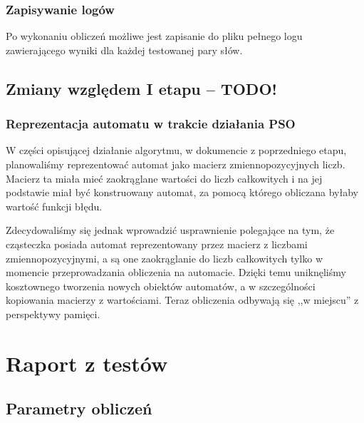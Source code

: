\documentclass{../llncs_template_final/llncs}
\begin{document}
\subsubsection{Zapisywanie logów}
Po wykonaniu obliczeń możliwe jest zapisanie do pliku pełnego logu zawierającego wyniki dla każdej testowanej pary słów.

\subsection{Zmiany względem I etapu -- TODO!}

\subsubsection{Reprezentacja automatu w trakcie działania PSO}

W części opisującej działanie algorytmu, w dokumencie z poprzedniego etapu, planowaliśmy reprezentować automat jako macierz zmiennopozycyjnych liczb. Macierz ta miała mieć zaokrąglane wartości do liczb całkowitych i na jej podstawie miał być konstruowany automat, za pomocą którego obliczana byłaby wartość funkcji błędu.

Zdecydowaliśmy się jednak wprowadzić usprawnienie polegające na tym, że cząsteczka posiada automat reprezentowany przez macierz z liczbami zmiennopozycyjnymi, a są one zaokrąglanie do liczb całkowitych tylko w momencie przeprowadzania obliczenia na automacie. Dzięki temu uniknęliśmy kosztownego tworzenia nowych obiektów automatów, a w szczególności kopiowania macierzy z wartościami. Teraz obliczenia odbywają się ,,w miejscu'' z perspektywy pamięci.



\section{Raport z testów}

\subsection{Parametry obliczeń}
\end{document}
